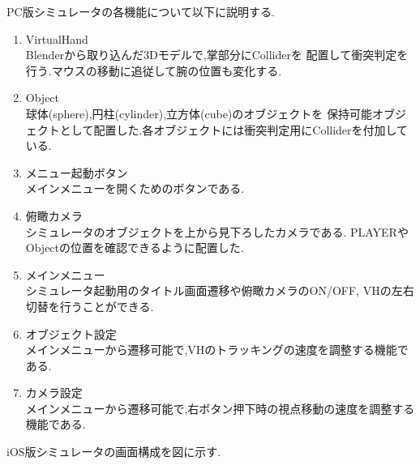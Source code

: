 \documentclass{ltjsreport}
\begin{document}
		PC版シミュレータの各機能について以下に説明する.
		\begin{enumerate}
			\item VirtualHand\\
				Blenderから取り込んだ3Dモデルで,掌部分にColliderを
				配置して衝突判定を行う.マウスの移動に追従して腕の位置も変化する.
			\item Object\\
				球体(sphere),円柱(cylinder),立方体(cube)のオブジェクトを
				保持可能オブジェクトとして配置した.各オブジェクトには衝突判定用にColliderを付加している.
			\item メニュー起動ボタン\\
				メインメニューを開くためのボタンである.
			\item 俯瞰カメラ\\
				シミュレータのオブジェクトを上から見下ろしたカメラである.
				PLAYERやObjectの位置を確認できるように配置した.
			\item メインメニュー\\
				シミュレータ起動用のタイトル画面遷移や俯瞰カメラのON/OFF,
				VHの左右切替を行うことができる.
\clearpage
			\item オブジェクト設定\\
				メインメニューから遷移可能で,VHのトラッキングの速度を調整する機能である.
			\item カメラ設定\\
				メインメニューから遷移可能で,右ボタン押下時の視点移動の速度を調整する機能である.
		\end{enumerate}

		iOS版シミュレータの画面構成を図に示す.
\end{document}
